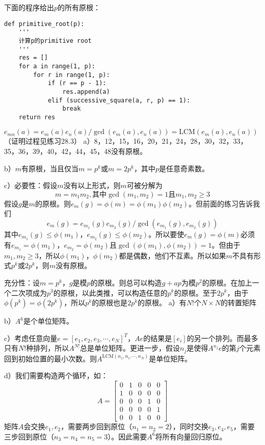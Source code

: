 %
\exercise 下面的程序给出$p$的所有原根：
\begin{lstlisting}
def primitive_root(p):
    '''
    计算p的primitive root
    '''
    res = []
    for a in range(1, p):
        for r in range(1, p):
            if (r == p - 1):
                res.append(a)
            elif (successive_square(a, r, p) == 1):
                break
    return res
\end{lstlisting}
%
\exercise $e_{mn}(a)=e_m(a)e_n(a)/\gcd(e_m(a),e_n(a))=\mathrm{LCM}(e_m(a),e_n(a))$（证明过程见练习28.3）
%
\exercise a）8，12，15，16，20，21，24，28，30，32，33，35，36，39，40，42，44，45，48没有原根。\par
b）$m$有原根，当且仅当$m=p^k$或$m=2p^k$，其中$p$是任意奇素数。\par
c）\proof 必要性：假设$m$没有以上形式，则$m$可被分解为
\[m=m_1m_2,\text{其中}\gcd(m_1,m_2)=1\text{且}m_1,m_2\ge3\]
假设$g$是$m$的原根。则$e_m(g)=\phi(m)=\phi(m_1)\phi(m_2)$。但前面的练习告诉我们
\[e_m(g)=e_{m_1}(g)e_{m_2}(g)/\gcd(e_{m_1}(g),e_{m_2}(g))\]
其中$e_{m_1}(g)\le\phi(m_1)$，$e_{m_2}(g)\le\phi(m_2)$。所以要使$e_m(g)=\phi(m)$必须有$e_{m_1}=\phi(m_1)$，$e_{m_2}=\phi(m_2)$且$\gcd(\phi(m_1),\phi(m_2))=1$。但由于$m_1,m_2\ge3$，所以$\phi(m_1)$，$\phi(m_2)$都是偶数，他们不互素。所以如果$m$不具有形式$p^k$或$2p^k$，则$m$没有原根。\par
充分性：设$m=p^k$，$g$是模$p$的原根。则总可以构造$g+ap$为模$p^2$的原根。在加上一个二次项成为$p^3$的原根，以此类推，可以构造任意的$p^k$的原根。至于$2p^k$，由于$\phi(p^k)=\phi(2p^k)$，所以$p^k$的原根也是$2p^k$的原根。
%
\exercise a）有$N!$个$N\times N$的转置矩阵\par
b）$A^6$是个单位矩阵。\par
c）考虑任意向量$e=[e_1, e_2, e_3,\cdots, e_N]^T$，$Ae$的结果是$[e_i]$的另一个排列。而最多只有$N!$种排列，所以$A^{N!}$总是单位矩阵。更进一步，假设$n_j$是使得$A^{n_j}e$的第$j$个元素回到初始位置的最小次数。则$A^{\mathrm{LCM}(n_1,n_i,\cdots,n_N)}$是单位矩阵。\par
d）我们需要构造两个循环，如：
\[A=\begin{bmatrix}
0 & 1 & 0 & 0 & 0 \\
1 & 0 & 0 & 0 & 0 \\
0 & 0 & 0 & 1 & 0 \\
0 & 0 & 0 & 0 & 1 \\
0 & 0 & 1 & 0 & 0 
\end{bmatrix}\]
矩阵$A$会交换$e_1,e_2$，需要两步回到原位（$n_1=n_2=2$），同时交换$e_3,e_4,e_5$，需要三步回到原位（$n_3=n_4=n_5=3$）。因此需要$A^6$将所有向量回归原位。
